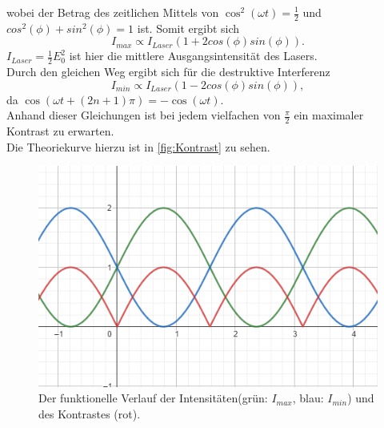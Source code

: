 wobei der Betrag des zeitlichen Mittels von $\cos^2{(\omega t)} = \frac{1}{2}$ und $cos^2{(\phi)} + sin^2{(\phi)} = 1$ ist. Somit ergibt sich
\begin{equation}
    I_{max} \propto I_{Laser} \left( 1 + 2 cos{(\phi)}sin{(\phi)} \right).
\end{equation}
$I_{Laser} = \frac{1}{2} E_0^2$ ist hier die mittlere Ausgangsintensität des Lasers.\\
Durch den gleichen Weg ergibt sich für die destruktive Interferenz
\begin{equation}
    I_{min} \propto I_{Laser} \left( 1 - 2 cos{(\phi)}sin{(\phi)} \right),
\end{equation}
da $\cos{(\omega t + (2n+1)\pi)} = -\cos{(\omega t)} $.\\
Anhand dieser Gleichungen ist bei jedem vielfachen von $\frac{\pi}{2}$ ein maximaler Kontrast zu erwarten.\\
Die Theoriekurve hierzu ist in \autoref{fig:Kontrast} zu sehen.
 
\begin{figure}
    \centering
    \includegraphics[scale=0.4]{content/V64_pictures/Kontrast.png}
    \caption{Der funktionelle Verlauf der Intensitäten(grün: $I_{max}$, blau: $I_{min}$) und des Kontrastes (rot).}
    \label{fig:Kontrast}
\end{figure}

